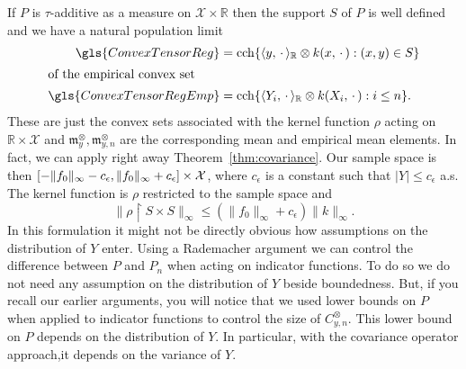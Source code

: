 \documentclass[10pt]{amsart}
\theoremstyle{definition}\newtheorem{defi}[theo]{Definition}\newtheorem{rema}[theo]{Remark}\newtheorem{exam}[theo]{Example}\newtheorem{exem}[theo]{Example}\newtheorem{nota}[theo]{Notation}
\theoremstyle{remark}
\DeclareMathOperator{\cch}{cch}
\newcommand{\restrr}
{\!\!\upharpoonright\!\!}
\newcommand{\R}{\mathbb{R}}
\newcommand{\X}{\mathcal{X}}
\newcommand{\mean}{\mathfrak{m}}
\begin{document}
If $P$ is $\tau$-additive as a measure on $\X \times \R$ then the support $S$ of $P$ is well defined and we have a natural population limit
\begin{align*}
\gls{ConvexTensorReg} &= \cch \{
\langle y, \,\cdot\, \rangle_\R \otimes k(x,\,\cdot\,) : (x,y) \in S\}
\\
\intertext{of the empirical convex set}
\gls{ConvexTensorRegEmp} &= \cch \{ \langle Y_i, \,\cdot\, \rangle_\R \otimes k(X_i,\,\cdot\,) : i \leq n\}.
\end{align*}
These are just the convex sets associated with the kernel function $\rho$ acting on $\R \times \X$ and $\mean_y^\otimes, \mean_{y,n}^\otimes$ are the corresponding mean and empirical mean elements. In fact, we can apply right away Theorem~\ref{thm:covariance}. Our sample space is then $[- \|f_0\|_\infty - c_\epsilon,\linebreak \|f_0\|_\infty + c_\epsilon] \times \X$, where $c_\epsilon$ is a constant such that $|Y| \leq c_\epsilon$ a.s. The kernel function is $\rho$ restricted to the sample space and
\[
\|\rho \restrr S \times S \|_\infty \leq (\|f_0\|_\infty + c_\epsilon) \|k\|_\infty.
\]
In this formulation it might not be directly obvious how assumptions on the distribution of $Y$ enter. Using a Rademacher argument we can control the difference between $P$ and $P_n$ when acting on indicator functions. To do so we do not need any assumption on the distribution of $Y$ beside boundedness. But, if you recall our earlier arguments, you will notice that we used lower bounds on $P$ when applied to indicator functions to control the size of $C^\otimes_{y,n}$. This lower bound on $P$ depends on the distribution of $Y$. In particular, with the covariance operator approach,\linebreak it depends on the variance of $Y$.
\end{document}
